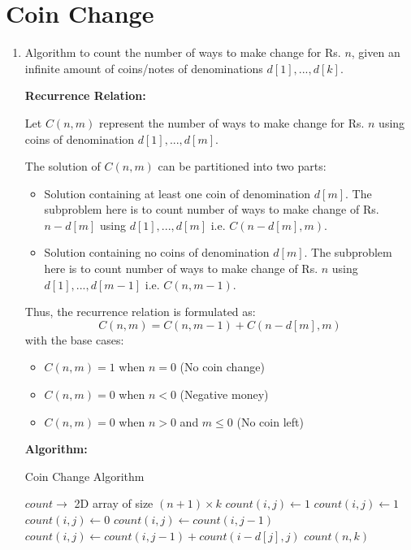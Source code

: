 \documentclass[a4paper]{article}
\begin{document}
\newpage
\section{Coin Change}
\begin{enumerate}[1.]
    \item Algorithm to count the number of ways to make change for Rs. $n$,
    given an infinite amount of coins/notes of denominations $d[1],...,d[k]$.
    
    \textbf{Recurrence Relation:}
    
    Let $C(n,m)$ represent the number of ways to make change for Rs. $n$ using coins of denomination $d[1],...,d[m]$.
    
    The solution of $C(n,m)$ can be partitioned into two parts:
    \begin{itemize}
        \item Solution containing at least one coin of denomination $d[m]$. The subproblem here is to count number of ways to make change of Rs. $n-d[m]$ using $d[1],...,d[m]$ i.e. $C(n-d[m],m)$.
        \item Solution containing no coins of denomination $d[m]$. The subproblem here is to count number of ways to make change of Rs. $n$ using $d[1],...,d[m-1]$ i.e. $C(n,m-1)$.
    \end{itemize}
    Thus, the recurrence relation is formulated as:
    \begin{equation}
        C(n,m) = C(n,m-1) + C(n-d[m],m)
    \end{equation}
    with the base cases:
    \begin{itemize}
        \item $C(n,m) = 1$ when $n=0$ (No coin change)
        \item $C(n,m) = 0$ when $n<0$ (Negative money)
        \item $C(n,m) = 0$ when $n>0$ and $m\leq0$ (No coin left)
    \end{itemize}
    
    \textbf{Algorithm:}
    
    {\centering
    \begin{minipage}{\linewidth}
    \begin{algorithm}[H]
    \caption{Coin Change Algorithm}\label{alg:cc}
    \begin{algorithmic}[1]
    \State $count \to$ 2D array of size $(n+1) \times k$
        $count(i,j) \gets 1$
         $count(i,j) \gets 1$
        \Else{} 
        $count(i,j) \gets 0$        
        \EndIf
     $count(i,j) \gets count(i,j-1)$
    \Else{} $count(i,j) \gets count(i,j-1)+count(i-d[j],j)$
    \EndIf
    \EndFor
    \EndFor
    \State \Return $count(n,k)$
    \EndProcedure
    \end{algorithmic}
    \end{algorithm}
    \end{minipage}
    \par}
    

\end{enumerate}
\end{document}
